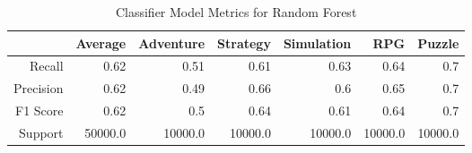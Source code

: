 \begin{table}[h]
    \centering
    \begin{tabular}{r|r|r|r|r|r|r}
        & Average & Adventure & Strategy & Simulation & RPG & Puzzle \\\hline
        Recall      & 0.62 & 0.51 & 0.61 & 0.63 & 0.64 & 0.7\\
        Precision   & 0.62 & 0.49 & 0.66 & 0.6 & 0.65 & 0.7\\
        F1 Score    & 0.62 & 0.5 & 0.64 & 0.61 & 0.64 & 0.7\\
        Support     & 50000.0 & 10000.0 & 10000.0 & 10000.0 & 10000.0 & 10000.0
\end{tabular}
    \caption{Classifier Model Metrics for Random Forest}
    \label{tab:model_metrics_random_forest}
\end{table}
